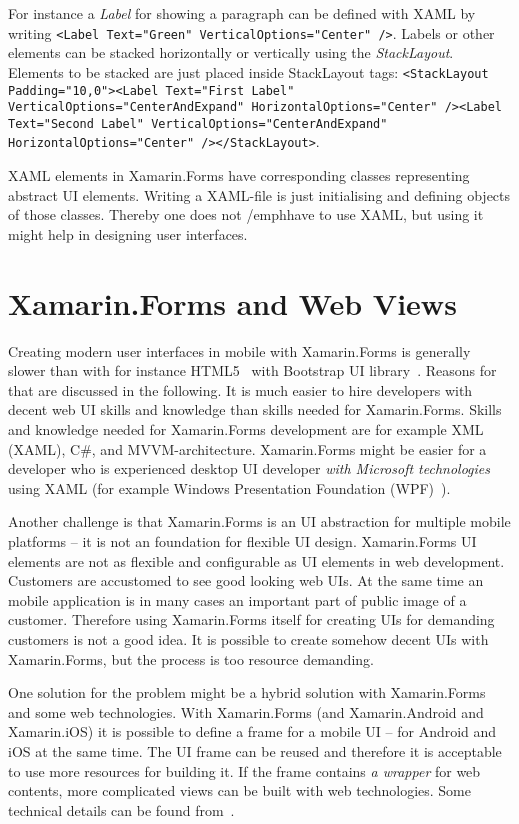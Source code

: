\documentclass[conference]{IEEEtran}
\newcommand{\code}[1]{\texttt{#1}}
\begin{document}
For instance a \emph{Label} for showing a paragraph can be defined with XAML by writing \code{<Label Text="Green" VerticalOptions="Center" />}. Labels or other elements can be stacked horizontally or vertically using the \emph{StackLayout}. Elements to be stacked are just placed inside StackLayout tags: \code{<StackLayout Padding="10,0"><Label Text="First Label" VerticalOptions="CenterAndExpand" HorizontalOptions="Center" /><Label Text="Second Label" VerticalOptions="CenterAndExpand" HorizontalOptions="Center" /></StackLayout>}.

XAML elements in Xamarin.Forms have corresponding classes representing abstract UI elements. Writing a XAML-file is just initialising and defining objects of those classes. Thereby one does not /emph{have to} use XAML, but using it might help in designing user interfaces.

\section{Xamarin.Forms and Web Views}

Creating modern user interfaces in mobile with Xamarin.Forms is generally slower than with for instance HTML5~\cite{html5} with Bootstrap UI library~\cite{bootstrap}. Reasons for that are discussed in the following. It is much easier to hire developers with decent web UI skills and knowledge than skills needed for Xamarin.Forms. Skills and knowledge needed for Xamarin.Forms development are for example XML (XAML), C\#, and MVVM-architecture. Xamarin.Forms might be easier for a developer who is experienced desktop UI developer \emph{with Microsoft technologies} using XAML (for example Windows Presentation Foundation (WPF)~\cite{wpf}).

Another challenge is that Xamarin.Forms is an UI abstraction for multiple mobile platforms -- it is not an foundation for flexible UI design. Xamarin.Forms UI elements are not as flexible and configurable as UI elements in web development. Customers are accustomed to see good looking web UIs. At the same time an mobile application is in many cases an important part of public image of a customer. Therefore using Xamarin.Forms itself for creating UIs for demanding customers is not a good idea. It is possible to create somehow decent UIs with Xamarin.Forms, but the process is too resource demanding.

One solution for the problem might be a hybrid solution with Xamarin.Forms and some web technologies. With Xamarin.Forms (and Xamarin.Android and Xamarin.iOS) it is possible to define a frame for a mobile UI -- for Android and iOS at the same time. The UI frame can be reused and therefore it is acceptable to use more resources for building it. If the frame contains \emph{a wrapper} for web contents, more complicated views can be built with web technologies. Some technical details can be found from~\cite{hwb}.
\end{document}
